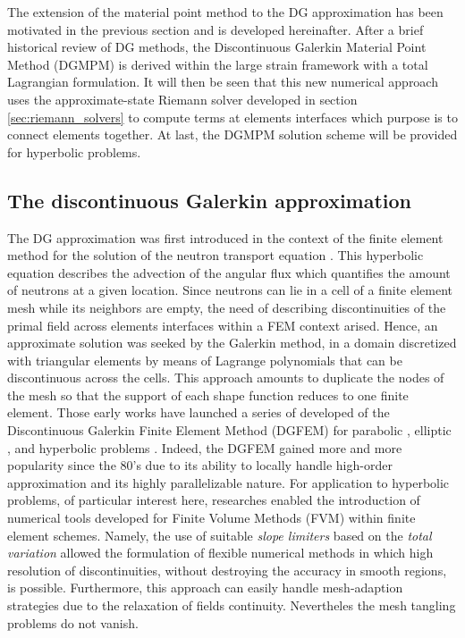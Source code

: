 The extension of the material point method to the DG approximation has been motivated in the previous section and is developed hereinafter. After a brief historical review of DG methods, the Discontinuous Galerkin Material Point Method (DGMPM) is derived within the large strain framework with a total Lagrangian formulation. It will then be seen that this new numerical approach uses the approximate-state Riemann solver developed in section \ref{sec:riemann_solvers} to compute terms at elements interfaces which purpose is to connect elements together. At last, the DGMPM solution scheme will be provided for hyperbolic problems.

\subsection{The discontinuous Galerkin approximation}
The DG approximation was first introduced in the context of the finite element method for the solution of the neutron transport equation \cite{NeutronDG}. This hyperbolic equation describes the advection of the angular flux which quantifies the amount of neutrons at a given location. Since neutrons can lie in a cell of a finite element mesh while its neighbors are empty, the need of describing discontinuities of the primal field across elements interfaces within a FEM context arised. Hence, an approximate solution was seeked by the Galerkin method, in a domain discretized with triangular elements by means of Lagrange polynomials that can be discontinuous across the cells. This approach amounts to duplicate the nodes of the mesh so that the support of each shape function reduces to one finite element. Those early works have launched a series of developed of the Discontinuous Galerkin Finite Element Method (DGFEM) for parabolic \cite{Arnold_IPM}, elliptic \cite{Hansbo_DGsolid,Noel_HEDG}, and hyperbolic problems \cite{Cockburn}. Indeed, the DGFEM gained more and more popularity since the 80's due to its ability to locally handle high-order approximation and its highly parallelizable nature. 
For application to hyperbolic problems, of particular interest here, researches enabled the introduction of numerical tools developed for Finite Volume Methods (FVM) within finite element schemes. Namely, the use of suitable \textit{slope limiters} based on the \textit{total variation} \cite{vanLeer_Limiters} allowed the formulation of flexible numerical methods in which high resolution of discontinuities, without destroying the accuracy in smooth regions, is possible. Furthermore, this approach can easily handle mesh-adaption strategies due to the relaxation of fields continuity. Nevertheles the mesh tangling problems do not vanish.

